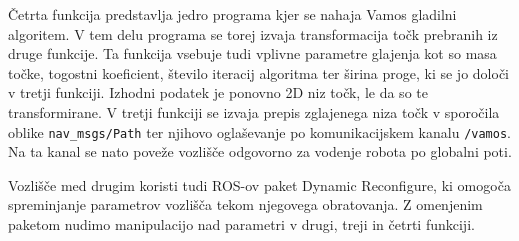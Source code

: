 \documentclass[10pt,a4paper]{article}
\begin{document}
Četrta funkcija predstavlja jedro programa kjer se nahaja Vamos gladilni algoritem. V tem delu programa se torej izvaja transformacija točk prebranih iz druge funkcije. Ta funkcija vsebuje tudi vplivne parametre glajenja kot so masa točke, togostni koeficient, število iteracij algoritma ter širina proge, ki se jo določi v tretji funkciji. Izhodni podatek je ponovno 2D niz točk, le da so te transformirane. V tretji funkciji se izvaja prepis zglajenega niza točk v sporočila oblike \verb|nav_msgs/Path| ter njihovo oglaševanje po komunikacijskem kanalu \verb|/vamos|. Na ta kanal se nato poveže vozlišče odgovorno za vodenje robota po globalni poti.

Vozlišče med drugim koristi tudi ROS-ov paket Dynamic Reconfigure, ki omogoča spreminjanje parametrov vozlišča tekom njegovega obratovanja. Z omenjenim paketom nudimo manipulacijo nad parametri v drugi, treji in četrti funkciji.
\end{document}
